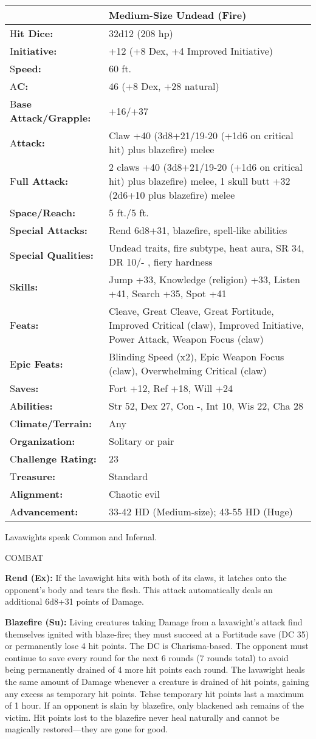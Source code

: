 \documentclass{article}
\begin{document}
{\begin{tabular}{|>{\raggedright}p{64pt}|>{\raggedright}p{261pt}|}
\hline
  & Medium-Size Undead (Fire) \tabularnewline
\hline
H\textbf{it Dice:} & 32d12 (208 hp) \tabularnewline
\hline
I\textbf{nitiative:} & +12 (+8 Dex, +4 Improved Initiative) \tabularnewline
\hline
S\textbf{peed:} & 60 ft. \tabularnewline
\hline
A\textbf{C:} & 46 (+8 Dex, +28 natural) \tabularnewline
\hline
B\textbf{ase Attack/Grapple:} & +16/+37\tabularnewline
\hline
A\textbf{ttack:} & Claw +40 (3d8+21/19-20 (+1d6 on critical hit) plus blazefire) 
melee\tabularnewline
\hline
F\textbf{ull Attack:} & 2 claws +40 (3d8+21/19-20 (+1d6 on critical hit) plus blazefire) 
melee, 1 skull butt +32 (2d6+10 plus blazefire) melee\tabularnewline
\hline
S\textbf{pace/Reach:} & 5 ft./5 ft. \tabularnewline
\hline
S\textbf{pecial Attacks:} & Rend 6d8+31, blazefire, spell-like abilities \tabularnewline
\hline
S\textbf{pecial Qualities:} & Undead traits, fire subtype, heat aura, SR 34, DR 
10/- , fiery hardness \tabularnewline
\hline
S\textbf{kills:} & Jump +33, Knowledge (religion) +33, Listen +41, Search +35, 
Spot +41\tabularnewline
\hline
F\textbf{eats:} & Cleave, Great Cleave, Great Fortitude, Improved Critical (claw), 
Improved Initiative, Power Attack, Weapon Focus (claw) \tabularnewline
\hline
E\textbf{pic Feats:} & Blinding Speed (x2), Epic Weapon Focus (claw), Overwhelming 
Critical (claw) \tabularnewline
\hline
S\textbf{aves:} & Fort +12, Ref +18, Will +24 \tabularnewline
\hline
A\textbf{bilities:} & Str 52, Dex 27, Con -, Int 10, Wis 22, Cha 28 \tabularnewline
\hline
C\textbf{limate/Terrain:} & Any \tabularnewline
\hline
O\textbf{rganization:} & Solitary or pair \tabularnewline
\hline
C\textbf{hallenge Rating:} & 23 \tabularnewline
\hline
T\textbf{reasure:} & Standard \tabularnewline
\hline
A\textbf{lignment:} & Chaotic evil \tabularnewline
\hline
A\textbf{dvancement:} & 33-42 HD (Medium-size); 43-55 HD (Huge)\tabularnewline
\hline
\end{tabular}

Lavawights speak Common and Infernal. 

COMBAT 

\textbf{Rend (Ex): }If the lavawight hits with both of its claws, it latches onto 
the opponent's body and tears the flesh. This attack automatically deals an additional 
6d8+31 points of Damage. 

\textbf{Blazefire (Su): }Living creatures taking Damage from a lavawight's attack 
find themselves ignited with blaze-fire; they must succeed at a Fortitude save 
(DC 35) or permanently lose 4 hit points. The DC is Charisma-based. The opponent 
must continue to save every round for the next 6 rounds (7 rounds total) to avoid 
being permanently drained of 4 more hit points each round. The lavawight heals 
the same amount of Damage whenever a creature is drained of hit points, gaining 
any excess as temporary hit points. Tehse temporary hit points last a maximum of 
1 hour. If an opponent is slain by blazefire, only blackened ash remains of the 
victim. Hit points lost to the blazefire never heal naturally and cannot be magically 
restored---they are gone for good. 

}
\end{document}
